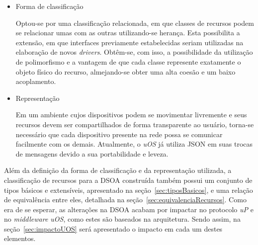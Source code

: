 \begin{itemize}
	\item Forma de classificação

	Optou-se por uma classificação relacionada, em que classes de recursos podem se relacionar umas com as outras utilizando-se herança. Esta possibilita a extensão, em que interfaces previamente estabelecidas seriam utilizadas na elaboração de novos \emph{drivers}. Obtêm-se, com isso, a possibilidade da utilização de polimorfismo e a vantagem de que cada classe represente exatamente o objeto físico do recurso, almejando-se obter uma alta coesão e um baixo acoplamento.

	\item Representação

	Em um ambiente cujos dispositivos podem se movimentar livremente e seus recursos devem ser compartilhados de forma transparente ao usuário, torna-se necessário que cada dispositivo presente na rede possa se comunicar facilmente com os demais. Atualmente, o \emph{uOS} já utiliza JSON em suas trocas de mensagens devido a sua portabilidade e leveza.

	\begin{comment}
	Tal formato apresenta as seguintes características:
	
		\begin{itemize}
	 		\item Baixo custo computacional~\cite{comparativojson};
	 		\item É auto-descritivo, o que facilita os processos de leitura e escrita por seres-humanos~\cite{json};
	 		\item É estruturado, o que facilita sua criação e análise por computadores~\cite{json};
	 		\item É independente de plataforma, pois utiliza UTF-8 como codificação~\cite{utf8}.
	 	\end{itemize}
	 \end{comment}
\end{itemize}

Além da definição da forma de classificação e da representação utilizada, a classificação de recursos para a DSOA construída também possui um conjunto de tipos básicos e extensíveis, apresentado na seção~\ref{sec:tiposBasicos}, e uma relação de equivalência entre eles, detalhada na seção~\ref{sec:equivalenciaRecursos}. Como era de se esperar, as alterações na DSOA acabam por impactar no protocolo \emph{uP} e no \emph{middleware uOS}, como estes são baseados na arquitetura. Sendo assim, na seção~\ref{sec:impactoUOS} será apresentado o impacto em cada um destes elementos.

